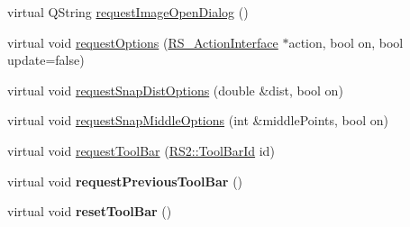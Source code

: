 \begin{DoxyCompactItemize}
\item 
virtual Q\-String \hyperlink{classQG__DialogFactory_a0983a4605afae0ae1fd63cde95ff7cc1}{request\-Image\-Open\-Dialog} ()
\item 
virtual void \hyperlink{classQG__DialogFactory_afe7ca8f0ffa8bd42b6d6cfdf471c6e29}{request\-Options} (\hyperlink{classRS__ActionInterface}{R\-S\-\_\-\-Action\-Interface} $\ast$action, bool on, bool update=false)
\item 
virtual void \hyperlink{classQG__DialogFactory_a15f383752323fd2a3ade29caa86f9ce3}{request\-Snap\-Dist\-Options} (double \&dist, bool on)
\item 
virtual void \hyperlink{classQG__DialogFactory_a99165c89ff93eea3edc32d50e1e26373}{request\-Snap\-Middle\-Options} (int \&middle\-Points, bool on)
\item 
virtual void \hyperlink{classQG__DialogFactory_acf1c9337a3f682472071e2b450c92169}{request\-Tool\-Bar} (\hyperlink{classRS2_a53db3c150d1d8d501b236d537de53793}{R\-S2\-::\-Tool\-Bar\-Id} id)
\item 
\hypertarget{classQG__DialogFactory_aa0f095be2d1b9925843d4efddcb25a53}{virtual void {\bfseries request\-Previous\-Tool\-Bar} ()}\label{classQG__DialogFactory_aa0f095be2d1b9925843d4efddcb25a53}

\item 
\hypertarget{classQG__DialogFactory_a1a6f1d3b899a1246e51bdb6800f4f8be}{virtual void {\bfseries reset\-Tool\-Bar} ()}\label{classQG__DialogFactory_a1a6f1d3b899a1246e51bdb6800f4f8be}


\end{DoxyCompactItemize}
